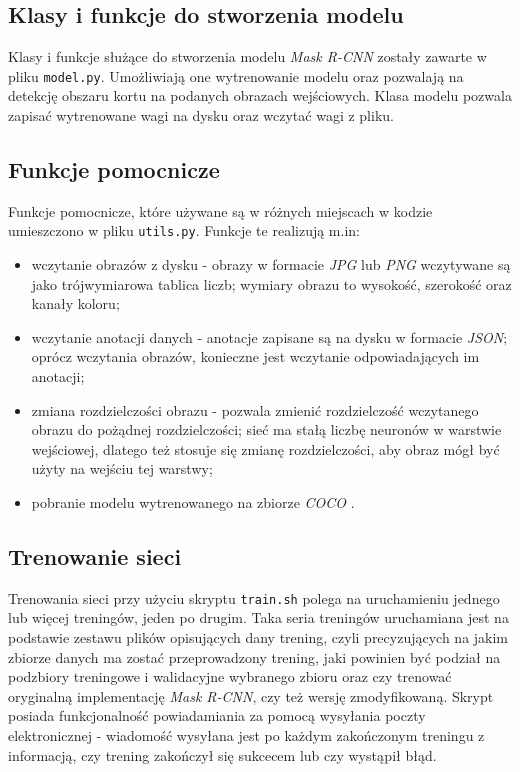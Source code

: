 \subsection*{Klasy i funkcje do stworzenia modelu}
Klasy i funkcje służące do stworzenia modelu \textit{Mask R-CNN} zostały zawarte w pliku \texttt{model.py}. Umożliwiają one wytrenowanie modelu oraz pozwalają na detekcję obszaru kortu na podanych obrazach wejściowych. Klasa modelu pozwala zapisać wytrenowane wagi na dysku oraz wczytać wagi z pliku.

\subsection*{Funkcje pomocnicze}
Funkcje pomocnicze, które używane są w różnych miejscach w kodzie umieszczono w pliku \texttt{utils.py}.
Funkcje te realizują m.in:

\begin{itemize}
  \item wczytanie obrazów z dysku - obrazy w formacie \textit{JPG} lub \textit{PNG} wczytywane są jako trójwymiarowa tablica liczb; wymiary obrazu to wysokość, szerokość oraz kanały koloru;
  \item wczytanie anotacji danych - anotacje zapisane są na dysku w formacie \textit{JSON}; oprócz wczytania obrazów, konieczne jest wczytanie odpowiadających im anotacji;
  \item zmiana rozdzielczości obrazu - pozwala zmienić rozdzielczość wczytanego obrazu do pożądnej rozdzielczości; sieć ma stałą liczbę neuronów w warstwie wejściowej, dlatego też stosuje się zmianę rozdzielczości, aby obraz mógł być użyty na wejściu tej warstwy;
  \item pobranie modelu wytrenowanego na zbiorze \textit{COCO} \cite{coco}.
\end{itemize}

\subsection*{Trenowanie sieci}

Trenowania sieci przy użyciu skryptu \texttt{train.sh} polega na uruchamieniu jednego lub więcej treningów, jeden po drugim. Taka seria treningów uruchamiana jest na podstawie zestawu plików opisujących dany trening, czyli precyzujących na jakim zbiorze danych ma zostać przeprowadzony trening, jaki powinien być podział na podzbiory treningowe i walidacyjne wybranego zbioru oraz czy trenować oryginalną implementację \textit{Mask R-CNN}, czy też wersję zmodyfikowaną. Skrypt posiada funkcjonalność powiadamiania za pomocą wysyłania poczty elektronicznej - wiadomość wysyłana jest po każdym zakończonym treningu z informacją, czy trening zakończył się sukcecem lub czy wystąpił błąd.

